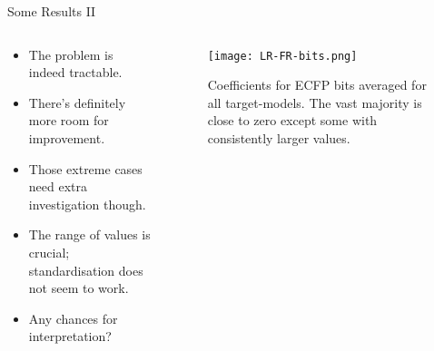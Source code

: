 \documentclass[11pt]{beamer}
\begin{document}

\begin{frame}{Some Results II}
\begin{columns}[T] %
    \begin{column}{.45\textwidth}
    	\vspace{3mm}
	\begin{itemize}
		\item The problem is indeed tractable.
		\item There's definitely more room for improvement.
		\item Those extreme cases need extra investigation though.
		\item The range of values is crucial; standardisation does not seem to work. 
		\item Any chances for interpretation?
	\end{itemize}
	
    \end{column}%
    \hfill%
    \begin{column}{.68\textwidth}
    	\vspace{-3mm}
        \begin{figure}
            \centering
            \texttt{[image: LR-FR-bits.png]}
            \caption{Coefficients for ECFP bits averaged for all target-models. The vast majority is close to zero except some with consistently larger values.}
            \label{fig:my_label}
        \end{figure}
    \end{column}%
\end{columns}
\end{frame}
\end{document}
